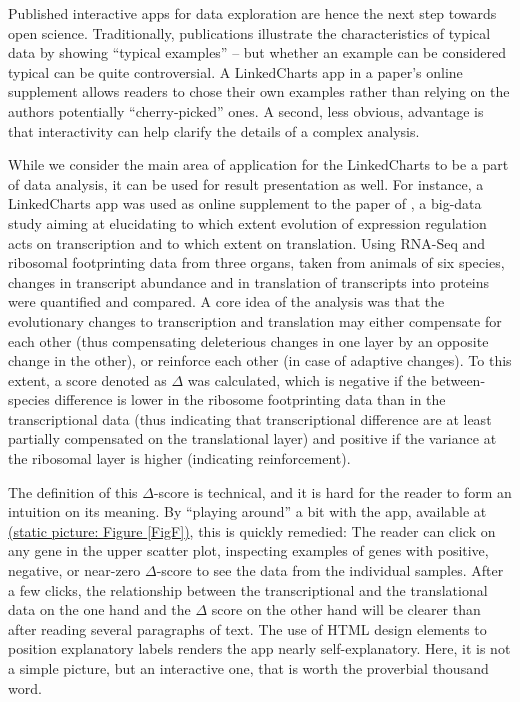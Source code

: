\documentclass[twocolumn,10pt]{article}
\begin{document}
Published interactive apps for data exploration are hence the next step towards open science. Traditionally, publications illustrate the characteristics of typical data by showing ``typical examples'' -- but whether an example can be considered typical can be quite controversial. A LinkedCharts app in a paper's online supplement allows readers to chose their own examples rather than relying on the authors potentially ``cherry-picked'' ones. A second, less obvious, advantage is that interactivity can help clarify the details of a complex analysis.

While we consider the main area of application for the LinkedCharts to be a part of data analysis, it can be used for result presentation as well. For instance, a LinkedCharts app was used as online supplement to the paper of \citet{wang_2020}, a big-data study aiming at elucidating to which extent evolution of expression regulation acts on transcription and to which extent on translation. Using RNA-Seq and ribosomal footprinting data from three organs, taken from animals of six species, changes in transcript abundance and in translation of transcripts into proteins were quantified and compared. A core idea of the analysis was that the evolutionary changes to transcription and translation may either compensate for each other  (thus compensating deleterious changes in one layer by an opposite change in the other), or reinforce each other (in case of adaptive changes). To this extent, a score denoted as $\Delta$ was calculated, which is negative if the between-species difference is lower in the ribosome footprinting data than in the transcriptional data (thus indicating that transcriptional difference are at least partially compensated on the translational layer) and positive if the variance at the ribosomal layer is higher (indicating reinforcement).

The definition of this $\Delta$-score is technical, and it is hard for the reader to form an intuition on its meaning. By ``playing around'' a bit with the app, available at \href{https://ex2plorer.kaessmannlab.org/}{(static picture: Figure \ref{FigF})}, this is quickly remedied:  The reader can click on any gene in the upper scatter plot, inspecting examples of genes with positive, negative, or near-zero $\Delta$-score to see the data from the individual samples. After a few clicks, the relationship between the transcriptional and the translational data on the one hand and the $\Delta$ score on the other hand will be clearer than after reading several paragraphs of text. The use of HTML design elements to position explanatory labels renders the app nearly self-explanatory. Here, it is not a simple picture, but an interactive one, that is worth the proverbial thousand word. 
\end{document}
